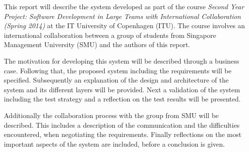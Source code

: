 \documentclass[../report.tex]{subfiles}
\begin{document}
This report will describe the system developed as part of the course \textit{Second Year Project: Software Development in Large Teams with International Collaboration (Spring 2014)} at the IT University of Copenhagen (ITU). The course involves an international collaboration between a group of students from Singapore Management University (SMU) and the authors of this report.

The motivation for developing this system will be described through a business case. Following that, the proposed system including the requirements will be specified. Subsequently an explanation of the design and architecture of the system and its different layers will be provided. Next a validation of the system including the test strategy and a reflection on the test results will be presented. 

Additionally the collaboration process with the group from SMU will be described. This includes a description of the communication and the difficulties encountered, when negotiating the requirements. Finally reflections on the most important aspects of the system are included, before a conclusion is given. 




\end{document}

